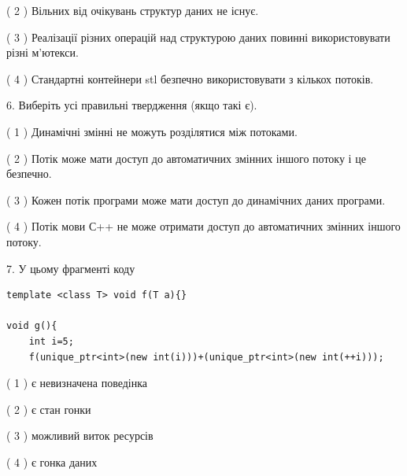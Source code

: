 \documentclass[12pt, ukrainian]{article}
\begin{document}
\begin {large}
{( 2 ) Вільних від очікувань структур даних не існує.%

( 3 ) Реалізації різних операцій над структурою даних повинні використовувати різні м’ютекси.%

( 4 ) Стандартні контейнери stl безпечно використовувати з кількох потоків.%
\newpage



\vspace{5mm}
6. Виберіть усі правильні твердження (якщо такі є).\par
\vspace{2mm}

( 1 ) Динамічні змінні не можуть розділятися між потоками.%

( 2 ) Потік може мати доступ до автоматичних змінних іншого потоку і це безпечно.%

( 3 ) Кожен потік програми може мати доступ до динамічних даних програми.%

( 4 ) Потік мови С++ не може отримати доступ до автоматичних змінних іншого потоку.%


\vspace{5mm}
7. У цьому фрагменті коду
\begin{verbatim}
template <class T> void f(T a){}

void g(){
    int i=5;
    f(unique_ptr<int>(new int(i)))+(unique_ptr<int>(new int(++i)));
\end{verbatim}
( 1 ) є невизначена поведінка%

( 2 ) є стан гонки%

( 3 ) можливий виток ресурсів%

( 4 ) є гонка даних%
}
\end {large}
\end{document}
